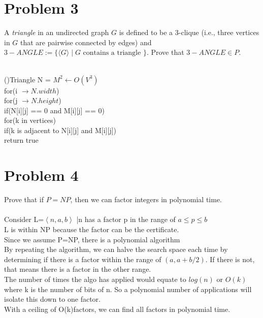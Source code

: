 \documentclass[12pt]{article}
\begin{document}
\section*{Problem 3}
A \emph{triangle} in an undirected graph $G $ is defined to be a 3-clique (i.e., three vertices in $G$ that are pairwise connected by edges)
and $3-ANGLE := \{ \langle G \rangle \mid G \mbox{ contains a triangle }\}$. Prove that $3-ANGLE \in P$. 
\\\\
\begin{algorithm}[H]
    \Fn(){Triangle}{
    \SetAlgoLined
    \SetNoFillComment
    \DontPrintSemicolon
    N = $M^2 \leftarrow O(V^3)$\\
    for(i $\rightarrow N.width$){\\
        \hspace{0.5cm}for(j $\rightarrow N.height$){\\
        \hspace{1cm}if(N[i][j] == 0 and M[i][j] == 0){\\
            \hspace{1.5cm}for(k in vertices){\\
                \hspace{2cm}if(k is adjacent to N[i][j] and M[i][j]){\\
                \hspace{2.5cm}return true}
            }
        }
        }    
    }
    }
    \end{algorithm}
\newpage
\section*{Problem 4}
Prove that if $P = NP$, then we can factor integers in polynomial time.
\\\\
Consider L={$\left\langle n,a,b\right\rangle$ |n has a factor p in the range of $a \leq p \leq b$}\\L is within NP because the factor can be the certificate.\\Since we assume P=NP, there is a polynomial algorithm\\By repeating the algorithm, we can halve the search space each time by determining if there is a factor within the range of $(a, a+b/2)$. If there is not, that means there is a factor in the other range. \\The number of times the algo has applied would equate to $log(n)$ or $O(k)$ where k is the number of bits of n. So a polynomial number of applications will isolate this down to one factor.\\With a ceiling of O(k)factors, we can find all factors in polynomial time.
\end{document}
